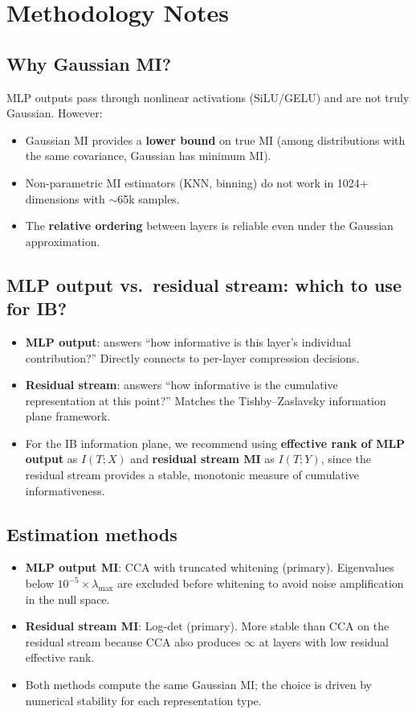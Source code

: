 \documentclass[11pt]{article}
\begin{document}
\section{Methodology Notes}

\subsection{Why Gaussian MI?}
MLP outputs pass through nonlinear activations (SiLU/GELU) and are not truly Gaussian. However:
\begin{itemize}
    \item Gaussian MI provides a \textbf{lower bound} on true MI (among distributions with the same covariance, Gaussian has minimum MI).
    \item Non-parametric MI estimators (KNN, binning) do not work in 1024+ dimensions with $\sim$65k samples.
    \item The \textbf{relative ordering} between layers is reliable even under the Gaussian approximation.
\end{itemize}

\subsection{MLP output vs.\ residual stream: which to use for IB?}
\begin{itemize}
    \item \textbf{MLP output}: answers ``how informative is this layer's individual contribution?'' Directly connects to per-layer compression decisions.
    \item \textbf{Residual stream}: answers ``how informative is the cumulative representation at this point?'' Matches the Tishby--Zaslavsky information plane framework.
    \item For the IB information plane, we recommend using \textbf{effective rank of MLP output} as $I(T;X)$ and \textbf{residual stream MI} as $I(T;Y)$, since the residual stream provides a stable, monotonic measure of cumulative informativeness.
\end{itemize}

\subsection{Estimation methods}
\begin{itemize}
    \item \textbf{MLP output MI}: CCA with truncated whitening (primary). Eigenvalues below $10^{-5} \times \lambda_{\max}$ are excluded before whitening to avoid noise amplification in the null space.
    \item \textbf{Residual stream MI}: Log-det (primary). More stable than CCA on the residual stream because CCA also produces $\infty$ at layers with low residual effective rank.
    \item Both methods compute the same Gaussian MI; the choice is driven by numerical stability for each representation type.
\end{itemize}
\end{document}
